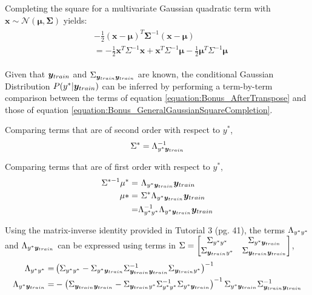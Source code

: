\documentclass[a4paper,12pt]{article}
\begin{document}
Completing the square for a multivariate Gaussian quadratic term with \\
$\bm{x} \sim \mathcal{N} \left( \bm{\mu}, \bm{\Sigma} \right)$ yields:
\begin{align}
\begin{split}
	& - \frac{1}{2} ( \bm{x} - \bm{\mu} )^{T} \bm{\Sigma}^{-1} ( \bm{x} - \bm{\mu} ) \\
    & \label{equation:Bonus_GeneralGaussianSquareCompletion} = - \frac{1}{2} \bm{x}^{T} \Sigma^{-1} \bm{x} + \bm{x}^{T} \Sigma^{-1} \bm{\mu}
    - \frac{1}{2} \bm{\mu}^{T} \Sigma^{-1} \bm{\mu}
\end{split}
\end{align}

Given that $\bm{y}_{train}$ and $\Sigma_{\bm{y}_{train} \bm{y}_{train}}$ are known, the conditional Gaussian Distribution $P(y^* | \bm{y}_{train})$ can be inferred by performing a term-by-term comparison between the terms of equation \ref{equation:Bonus_AfterTranspose} and those of equation \ref{equation:Bonus_GeneralGaussianSquareCompletion}.

Comparing terms that are of second order with respect to $y^*$,
\begin{align}
	\label{equation:Bonus_ConditionalSigma} \Sigma^* = \Lambda_{y^* \bm{y}_{train}}^{-1}
\end{align}

Comparing terms that are of first order with respect to $y^*$,
\begin{align}
\begin{split}
	\Sigma^{*-1} \mu^{*} =& \ \Lambda_{y^* \bm{y}_{train}} \bm{y}_{train} \\
    \mu* =& \ \Sigma^* \Lambda_{y^* \bm{y}_{train}} \bm{y}_{train} \\
    \label{equation:Bonus_ConditionalMu} =& \Lambda_{y^* y^*}^{-1} \Lambda_{y^* \bm{y}_{train}} \bm{y}_{train}
\end{split}
\end{align}

Using the matrix-inverse identity provided in Tutorial 3 (pg. 41), the terms $\Lambda_{y^* y^*}$ and $\Lambda_{y^* \bm{y}_{train}}$ can be expressed using terms in $\Sigma = \begin{bmatrix} \Sigma_{y^* y^*} & \Sigma_{y^* \bm{y}_{train}} \\ \Sigma_{\bm{y}_{train} y^*} & \Sigma_{\bm{y}_{train} \bm{y}_{train}} \end{bmatrix}$,
\begin{align}
\begin{split}
	\Lambda_{y^* y^*} =& \left( \Sigma_{y^* y^*} - \Sigma_{y^* \bm{y}_{train}} \Sigma_{\bm{y}_{train} \bm{y}_{train}}^{-1} \Sigma_{\bm{y}_{train} y^*} \right)^{-1} \\
    \Lambda_{y^* \bm{y}_{train}} =& - \left( \Sigma_{\bm{y}_{train} \bm{y}_{train}} - \Sigma_{\bm{y}_{train} y^*} \Sigma_{y^* y^*}^{-1} \Sigma_{y^* \bm{y}_{train}} \right)^{-1} 
    	\Sigma_{y^* \bm{y}_{train}} \Sigma_{\bm{y}_{train} \bm{y}_{train}}^{-1} \\
\end{split}
\end{align}
\end{document}
